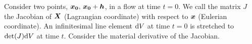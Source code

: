 Consider two points, $\boldsymbol{x_0},\,\boldsymbol{x_0}+\boldsymbol{h}$, in a flow at time $t=0$. We call the matrix $J$ the Jacobian of $\boldsymbol{X}$ (Lagrangian coordinate) with respect to $\boldsymbol{x}$ (Eulerian coordinate).
An infinitesimal line element $\mathrm{d} V$ at time $t=0$ is stretched to $\det(J)\mathrm{d} V$ at time $t$. Consider the material derivative of the Jacobian. \todo{}

